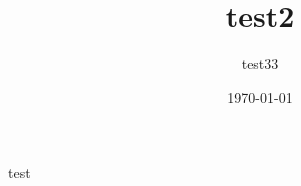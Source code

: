\documentclass[handout,t]{beamer}
\title[test]{test2}
\date{\today}
\author[test1]{test33}
\institute{School of Data and Computer Science(SYSU)}
\begin{document}

\frame{\titlepage}
\section[]{}
\begin{frame}{test}
  \tableofcontents
\end{frame}





\end{document}
